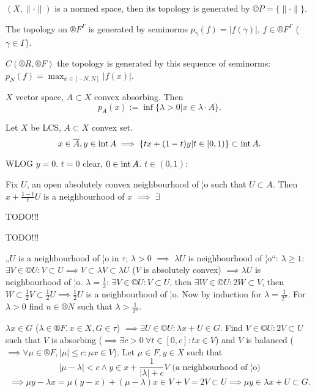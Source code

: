 \documentclass[12pt]{article}					%
\begin{document}
\begin{priklady}
	$(X, \|·\|)$ is a normed space, then its topology is generated by $©P = \{\|·\|\}$.

	The topology on $®F^Γ$ is generated by seminorms $p_γ(f) = |f(γ)|$, $f \in ®F^Γ$ ($γ \in Γ$).

	$C(®R, ®F)$ the topology is generated by this sequence of seminorms: $p_N(f) = \max_{x \in [-N, N]} |f(x)|$.
\end{priklady}

\begin{definice}
	$X$ vector space, $A \subset X$ convex absorbing. Then
	$$ p_A(x) := \inf \{λ > 0 | x \in λ·A\}. $$
\end{definice}

\begin{lemma}
	Let $X$ be LCS, $A \subset X$ convex set.
	$$ x \in \overline{A}, y \in \operatorname{int} A \implies \{tx + (1 - t)y | t \in [0, 1)\} \subset \operatorname{int} A. $$

	\begin{dukazin}
		WLOG $y = 0$. $t = 0$ clear, $0 \in \operatorname{int} A$. $t \in (0, 1)$:

		Fix $U$, an open absolutely convex neighbourhood of ¦o such that $U \subset A$. Then $x + \frac{1 - t}{t} U$ is a neighbourhood of $x$ $\implies$ $\exists $

		TODO!!!
	\end{dukazin}
\end{lemma}

TODO!!!


\begin{dukaz}
	„$U$ is a neighbourhood of ¦o in $τ$, $λ > 0$ $\implies$ $λU$ is neighbourhood of ¦o“: $λ ≥ 1$: $\exists V \in ©U: V \subset U \implies V \subset λV \subset λU$ ($V$ is absolutely convex) $\implies λU$ is neighbourhood of ¦o. $λ = \frac{1}{2}$: $\exists V \in ©U: V \subset U$, then $\exists W \in ©U: 2W \subset V$, then $W \subset \frac{1}{2} V \subset \frac{1}{2}U \implies \frac{1}{2} U$ is a neighbourhood of ¦o. Now by induction for $λ = \frac{1}{2^n}$. For $λ > 0$ find $n \in ®N$ such that $λ > \frac{1}{2^n}$.

	$λx \in G$ ($λ \in ®F, x \in X, G \in τ$) $\implies \exists U \in ©U: λx + U \in G$. Find $V \in ©U: 2V \subset U$ such that $V$ is absorbing ($\implies \exists c > 0\ \forall t \in [0, c]: tx \in V$) and $V$ is balanced ($\implies \forall μ \in ®F, |μ| ≤ c: μ x \in V$). Let $μ \in F, y \in X$ such that
	$$ |μ - λ| < c \land y \in x + \frac{1}{|λ| + c}V \text{ (a neighbourhood of ¦o)} $$
	$$ \implies μy - λx = μ(y - x) + (μ - λ)x \in V + V = 2V \subset U \implies μy \in λx + U \subset G. $$
\end{dukaz}
\end{document}
